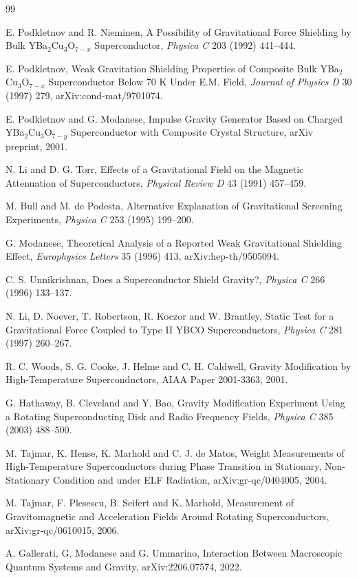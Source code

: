 \documentclass[11pt]{article}
\begin{document}
\begin{thebibliography}{99}

 E. Podkletnov and R. Nieminen, A Possibility of Gravitational Force Shielding by Bulk YBa$_2$Cu$_3$O$_{7-x}$ Superconductor, \emph{Physica C} 203 (1992) 441--444.

 E. Podkletnov, Weak Gravitation Shielding Properties of Composite Bulk YBa$_2$Cu$_3$O$_{7-x}$ Superconductor Below 70 K Under E.M. Field, \emph{Journal of Physics D} 30 (1997) 279, arXiv:cond-mat/9701074.

 E. Podkletnov and G. Modanese, Impulse Gravity Generator Based on Charged YBa$_2$Cu$_3$O$_{7-y}$ Superconductor with Composite Crystal Structure, arXiv preprint, 2001.

 N. Li and D. G. Torr, Effects of a Gravitational Field on the Magnetic Attenuation of Superconductors, \emph{Physical Review D} 43 (1991) 457--459.

 M. Bull and M. de Podesta, Alternative Explanation of Gravitational Screening Experiments, \emph{Physica C} 253 (1995) 199--200.

 G. Modanese, Theoretical Analysis of a Reported Weak Gravitational Shielding Effect, \emph{Europhysics Letters} 35 (1996) 413, arXiv:hep-th/9505094.

 C. S. Unnikrishnan, Does a Superconductor Shield Gravity?, \emph{Physica C} 266 (1996) 133--137.

 N. Li, D. Noever, T. Robertson, R. Koczor and W. Brantley, Static Test for a Gravitational Force Coupled to Type II YBCO Superconductors, \emph{Physica C} 281 (1997) 260--267.

 R. C. Woods, S. G. Cooke, J. Helme and C. H. Caldwell, Gravity Modification by High-Temperature Superconductors, AIAA Paper 2001-3363, 2001.

 G. Hathaway, B. Cleveland and Y. Bao, Gravity Modification Experiment Using a Rotating Superconducting Disk and Radio Frequency Fields, \emph{Physica C} 385 (2003) 488--500.

 M. Tajmar, K. Hense, K. Marhold and C. J. de Matos, Weight Measurements of High-Temperature Superconductors during Phase Transition in Stationary, Non-Stationary Condition and under ELF Radiation, arXiv:gr-qc/0404005, 2004.

 M. Tajmar, F. Plesescu, B. Seifert and K. Marhold, Measurement of Gravitomagnetic and Acceleration Fields Around Rotating Superconductors, arXiv:gr-qc/0610015, 2006.

 A. Gallerati, G. Modanese and G. Ummarino, Interaction Between Macroscopic Quantum Systems and Gravity, arXiv:2206.07574, 2022.

\end{thebibliography}
\end{document}
